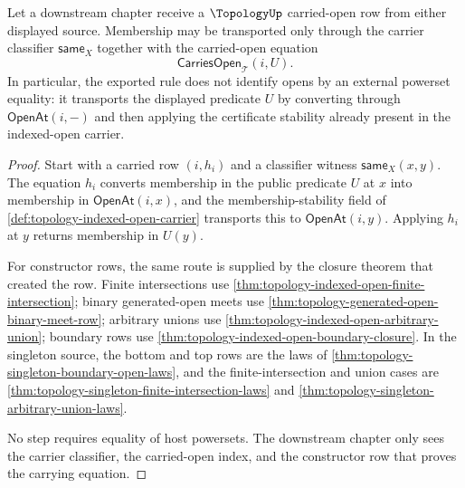 \begin{theorem}
\label{thm:topology-downstream-carrier-classifier-scope}
Let a downstream chapter receive a $\TopologyUp$ carried-open row from either displayed source. Membership may be transported only through the carrier classifier $\mathsf{same}_X$ together with the carried-open equation
$$
\mathsf{CarriesOpen}_{\mathcal{T}}(i,U).
$$
In particular, the exported rule does not identify opens by an external powerset equality: it transports the displayed predicate $U$ by converting through $\mathsf{OpenAt}(i,-)$ and then applying the certificate stability already present in the indexed-open carrier.
\end{theorem}
\begin{proof}
Start with a carried row $(i,h_i)$ and a classifier witness $\mathsf{same}_X(x,y)$. The equation $h_i$ converts membership in the public predicate $U$ at $x$ into membership in $\mathsf{OpenAt}(i,x)$, and the membership-stability field of \autoref{def:topology-indexed-open-carrier} transports this to $\mathsf{OpenAt}(i,y)$. Applying $h_i$ at $y$ returns membership in $U(y)$.

For constructor rows, the same route is supplied by the closure theorem that created the row. Finite intersections use \autoref{thm:topology-indexed-open-finite-intersection}; binary generated-open meets use \autoref{thm:topology-generated-open-binary-meet-row}; arbitrary unions use \autoref{thm:topology-indexed-open-arbitrary-union}; boundary rows use \autoref{thm:topology-indexed-open-boundary-closure}. In the singleton source, the bottom and top rows are the laws of \autoref{thm:topology-singleton-boundary-open-laws}, and the finite-intersection and union cases are \autoref{thm:topology-singleton-finite-intersection-laws} and \autoref{thm:topology-singleton-arbitrary-union-laws}.

No step requires equality of host powersets. The downstream chapter only sees the carrier classifier, the carried-open index, and the constructor row that proves the carrying equation.
\end{proof}


